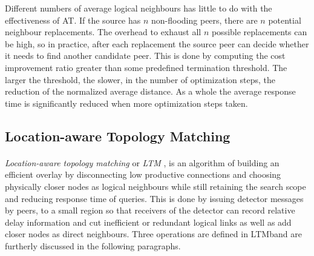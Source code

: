 \documentclass[a4paper,10pt]{article}
\begin{document}
Different numbers of average logical neighbours has little to do with the effectiveness of AT. If the source has $n$ non-flooding peers, there are $n$ potential neighbour replacements. The overhead to exhaust all $n$ possible replacements can be high, so in practice, after each replacement the source peer can decide whether it needs to find another candidate peer. This is done by computing the cost improvement ratio greater than some predefined termination threshold. The larger the threshold, the slower, in the number of optimization steps, the reduction of the normalized average distance. As a whole the average response time is significantly reduced when more optimization steps taken.

\subsection{Location-aware Topology Matching}

\paragraph*{}
\emph{Location-aware topology matching} or \emph{LTM} \cite{liu_ltm_2004}, is an algorithm of building an efficient overlay by disconnecting low productive connections and choosing physically closer nodes as logical neighbours while still retaining the search scope and reducing response time of queries. This is done by issuing detector messages by peers, to a small region so that receivers of the detector can record relative delay information and cut inefficient or redundant logical links as well as add closer nodes as direct neighbours. Three operations are defined in LTMband are furtherly discussed in the following paragraphs.
\end{document}
